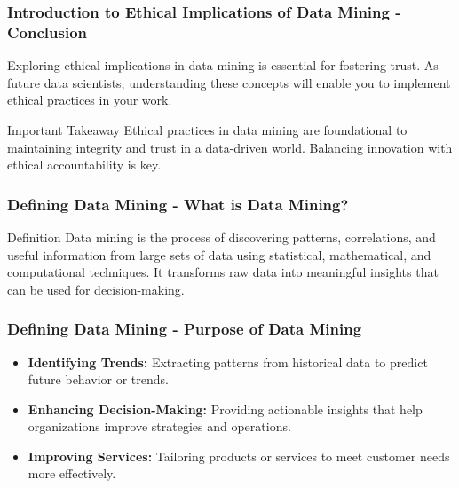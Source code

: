 \documentclass{beamer}
\begin{document}
\begin{frame}[fragile]
    \frametitle{Introduction to Ethical Implications of Data Mining - Conclusion}
    Exploring ethical implications in data mining is essential for fostering trust. As future data scientists, understanding these concepts will enable you to implement ethical practices in your work.
    
    \begin{block}{Important Takeaway}
        Ethical practices in data mining are foundational to maintaining integrity and trust in a data-driven world. Balancing innovation with ethical accountability is key.
    \end{block}
\end{frame}

\begin{frame}[fragile]
    \frametitle{Defining Data Mining - What is Data Mining?}
    \begin{block}{Definition}
        Data mining is the process of discovering patterns, correlations, and useful information from large sets of data using statistical, mathematical, and computational techniques. It transforms raw data into meaningful insights that can be used for decision-making.
    \end{block}
\end{frame}

\begin{frame}[fragile]
    \frametitle{Defining Data Mining - Purpose of Data Mining}
    \begin{itemize}
        \item \textbf{Identifying Trends:} Extracting patterns from historical data to predict future behavior or trends.
        \item \textbf{Enhancing Decision-Making:} Providing actionable insights that help organizations improve strategies and operations.
        \item \textbf{Improving Services:} Tailoring products or services to meet customer needs more effectively.
    \end{itemize}
\end{frame}
\end{document}
